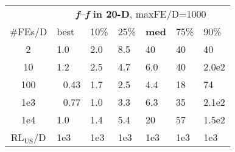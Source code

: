 \begin{tabular}{c|llllll}
 & \multicolumn{6}{|c}{\textbf{\textit{f}\raisebox{-0.35ex}{1}--\textit{f}\raisebox{-0.35ex}{24} in 20-D}, maxFE/D=1000}\\
\#FEs/D & best & 10\% & 25\% & \textbf{med} & 75\% & 90\%\\
2 & \hspace*{1ex}1.0 & \hspace*{1ex}2.0 & \hspace*{1ex}8.5 & 40 & 40 & 40\\
10 & \hspace*{1ex}1.2 & \hspace*{1ex}2.5 & \hspace*{1ex}4.7 & \hspace*{1ex}6.0 & 40 & 2.0e2\\
100 & ~\,0.43 & \hspace*{1ex}1.7 & \hspace*{1ex}2.5 & \hspace*{1ex}4.4 & 18 & 74\\
1e3 & ~\,0.77 & \hspace*{1ex}1.0 & \hspace*{1ex}3.3 & \hspace*{1ex}6.3 & 35 & 2.1e2\\
1e4 & \hspace*{1ex}1.0 & \hspace*{1ex}1.4 & \hspace*{1ex}5.4 & 20 & 57 & 1.5e2\\
$\text{RL}_{\text{US}}$/D & 1e3 & 1e3 & 1e3 & 1e3 & 1e3 & 1e3
\end{tabular}
